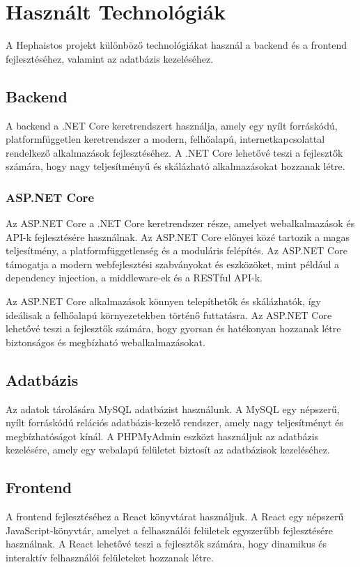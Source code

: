 \documentclass{article}
\begin{document}
\section{Használt Technológiák}
A Hephaistos projekt különböző technológiákat használ a backend és a frontend fejlesztéséhez, valamint az adatbázis kezeléséhez.

\subsection{Backend}
A backend a .NET Core keretrendszert használja, amely egy nyílt forráskódú, platformfüggetlen keretrendszer a modern, felhőalapú, internetkapcsolattal rendelkező alkalmazások fejlesztéséhez. A .NET Core lehetővé teszi a fejlesztők számára, hogy nagy teljesítményű és skálázható alkalmazásokat hozzanak létre.

\subsubsection{ASP.NET Core}
Az ASP.NET Core a .NET Core keretrendszer része, amelyet webalkalmazások és API-k fejlesztésére használnak. Az ASP.NET Core előnyei közé tartozik a magas teljesítmény, a platformfüggetlenség és a moduláris felépítés. Az ASP.NET Core támogatja a modern webfejlesztési szabványokat és eszközöket, mint például a dependency injection, a middleware-ek és a RESTful API-k.

Az ASP.NET Core alkalmazások könnyen telepíthetők és skálázhatók, így ideálisak a felhőalapú környezetekben történő futtatásra. Az ASP.NET Core lehetővé teszi a fejlesztők számára, hogy gyorsan és hatékonyan hozzanak létre biztonságos és megbízható webalkalmazásokat.

\subsection{Adatbázis}
Az adatok tárolására MySQL adatbázist használunk. A MySQL egy népszerű, nyílt forráskódú relációs adatbázis-kezelő rendszer, amely nagy teljesítményt és megbízhatóságot kínál. A PHPMyAdmin eszközt használjuk az adatbázis kezelésére, amely egy webalapú felületet biztosít az adatbázisok kezeléséhez.

\subsection{Frontend}
A frontend fejlesztéséhez a React könyvtárat használjuk. A React egy népszerű JavaScript-könyvtár, amelyet a felhasználói felületek egyszerűbb fejlesztésére használnak. A React lehetővé teszi a fejlesztők számára, hogy dinamikus és interaktív felhasználói felületeket hozzanak létre.
\end{document}
